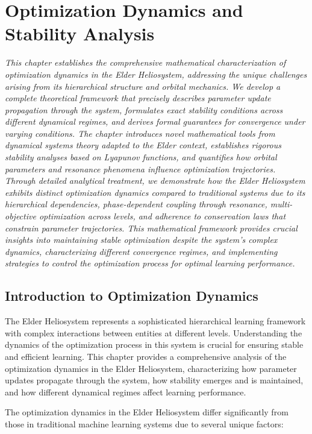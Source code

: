 \chapter{Optimization Dynamics and Stability Analysis}

\textit{This chapter establishes the comprehensive mathematical characterization of optimization dynamics in the Elder Heliosystem, addressing the unique challenges arising from its hierarchical structure and orbital mechanics. We develop a complete theoretical framework that precisely describes parameter update propagation through the system, formulates exact stability conditions across different dynamical regimes, and derives formal guarantees for convergence under varying conditions. The chapter introduces novel mathematical tools from dynamical systems theory adapted to the Elder context, establishes rigorous stability analyses based on Lyapunov functions, and quantifies how orbital parameters and resonance phenomena influence optimization trajectories. Through detailed analytical treatment, we demonstrate how the Elder Heliosystem exhibits distinct optimization dynamics compared to traditional systems due to its hierarchical dependencies, phase-dependent coupling through resonance, multi-objective optimization across levels, and adherence to conservation laws that constrain parameter trajectories. This mathematical framework provides crucial insights into maintaining stable optimization despite the system's complex dynamics, characterizing different convergence regimes, and implementing strategies to control the optimization process for optimal learning performance.}

\section{Introduction to Optimization Dynamics}

The Elder Heliosystem represents a sophisticated hierarchical learning framework with complex interactions between entities at different levels. Understanding the dynamics of the optimization process in this system is crucial for ensuring stable and efficient learning. This chapter provides a comprehensive analysis of the optimization dynamics in the Elder Heliosystem, characterizing how parameter updates propagate through the system, how stability emerges and is maintained, and how different dynamical regimes affect learning performance.

The optimization dynamics in the Elder Heliosystem differ significantly from those in traditional machine learning systems due to several unique factors:

